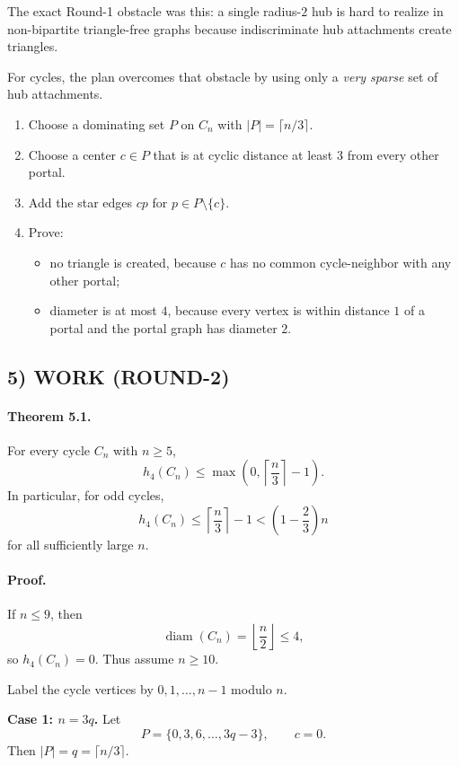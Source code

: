 The exact Round-1 obstacle was this: a single radius-$2$ hub is hard to realize in non-bipartite triangle-free graphs because indiscriminate hub attachments create triangles.

For cycles, the plan overcomes that obstacle by using only a \emph{very sparse} set of hub attachments.

\begin{enumerate}
\item Choose a dominating set $P$ on $C_n$ with $|P|=\lceil n/3\rceil$.
\item Choose a center $c\in P$ that is at cyclic distance at least $3$ from every other portal.
\item Add the star edges $cp$ for $p\in P\setminus\{c\}$.
\item Prove:
\begin{itemize}
\item no triangle is created, because $c$ has no common cycle-neighbor with any other portal;
\item diameter is at most $4$, because every vertex is within distance $1$ of a portal and the portal graph has diameter $2$.
\end{itemize}
\end{enumerate}

\subsection*{5) WORK (ROUND-2)}

\paragraph{Theorem 5.1.}
For every cycle $C_n$ with $n\ge 5$,
\[
h_4(C_n)\le \max\left(0,\left\lceil \frac n3\right\rceil -1\right).
\]
In particular, for odd cycles,
\[
h_4(C_n)\le \left\lceil \frac n3\right\rceil -1 < \left(1-\frac23\right)n
\]
for all sufficiently large $n$.

\paragraph{Proof.}
If $n\le 9$, then
\[
\operatorname{diam}(C_n)=\left\lfloor \frac n2\right\rfloor \le 4,
\]
so $h_4(C_n)=0$. Thus assume $n\ge 10$.

Label the cycle vertices by $0,1,\dots,n-1$ modulo $n$.

\medskip
\noindent
\textbf{Case 1: $n=3q$.}
Let
\[
P=\{0,3,6,\dots,3q-3\},
\qquad c=0.
\]
Then $|P|=q=\lceil n/3\rceil$.

